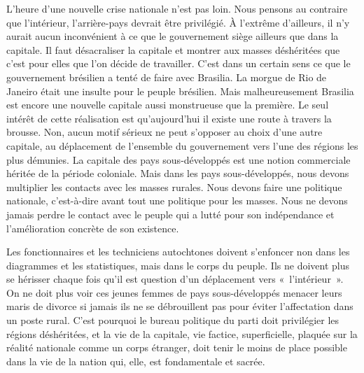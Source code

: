 \documentclass[french,twoside]{book} %
\begin{document}
\noindent L’heure d’une nouvelle crise nationale n’est pas loin. Nous pensons au contraire que l’intérieur, l’arrière-pays devrait être privilégié. À l’extrême d’ailleurs, il n’y aurait aucun inconvénient à ce que le gouvernement siège ailleurs que dans la capitale. Il faut désacraliser la capitale et montrer aux masses déshéritées que c’est pour elles que l’on décide de travailler. C’est dans un certain sens ce que le gouvernement brésilien a tenté de faire avec Brasilia. La morgue de Rio de Janeiro était une insulte pour le peuple brésilien. Mais malheureusement Brasilia est encore une nouvelle capitale aussi monstrueuse que la première. Le seul intérêt de cette réalisation est qu’aujourd’hui il existe une route à travers la brousse. Non, aucun motif sérieux ne peut s’opposer au choix d’une autre capitale, au déplacement de l’ensemble du gouvernement vers l’une des régions les plus démunies. La capitale des pays sous-développés est une notion commerciale héritée de la période coloniale. Mais dans les pays sous-développés, nous devons multiplier les contacts avec les masses rurales. Nous devons faire une politique nationale, c’est-à-dire avant tout une politique pour les masses. Nous ne devons jamais perdre le contact avec le peuple qui a lutté pour son indépendance et l’amélioration concrète de son existence.\par
\bigbreak
\noindent Les fonctionnaires et les techniciens autochtones doivent s’enfoncer non dans les diagrammes et les statistiques, mais dans le corps du peuple. Ils ne doivent plus se hérisser chaque fois qu’il est question d’un déplacement vers « l’intérieur ». On ne doit plus voir ces jeunes femmes de pays sous-développés menacer leurs maris de divorce si jamais ils ne se débrouillent pas pour éviter l’affectation dans un poste rural. C’est pourquoi   le bureau politique du parti doit privilégier les régions déshéritées, et la vie de la capitale, vie factice, superficielle, plaquée sur la réalité nationale comme un corps étranger, doit tenir le moins de place possible dans la vie de la nation qui, elle, est fondamentale et sacrée.\par
\end{document}
